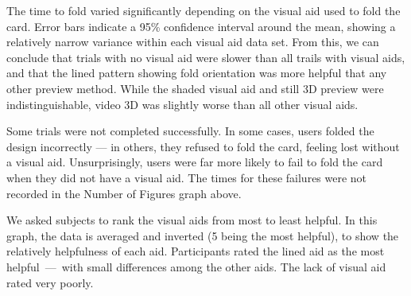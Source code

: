 The time to fold varied significantly depending on the visual aid used
to fold the card. Error bars indicate a 95\% confidence interval around
the mean, showing a relatively narrow variance within each visual aid
data set. From this, we can conclude that trials with no visual aid were
slower than all trails with visual aids, and that the lined pattern
showing fold orientation was more helpful that any other preview method.
While the shaded visual aid and still 3D preview were indistinguishable,
video 3D was slightly worse than all other visual aids.


Some trials were not completed successfully. In some cases, users folded
the design incorrectly --- in others, they refused to fold the card,
feeling lost without a visual aid. Unsurprisingly, users were far more
likely to fail to fold the card when they did not have a visual aid. The
times for these failures were not recorded in the Number of Figures
graph above.


We asked subjects to rank the visual aids from most to least helpful. In
this graph, the data is averaged and inverted (5 being the most
helpful), to show the relatively helpfulness of each aid. Participants
rated the lined aid as the most helpful~---~with small differences among
the other aids. The lack of visual aid rated very poorly.


